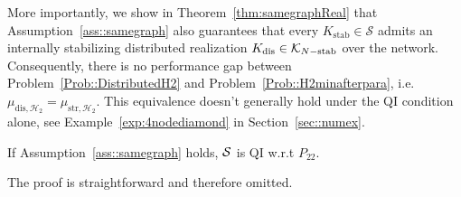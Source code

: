 More importantly, we show in Theorem~\ref{thm:samegraphReal} that Assumption~\ref{ass::samegraph} also guarantees that every \(K_\mathrm{stab}\in \mathcal{S}\) admits an internally stabilizing distributed realization \(K_{\mathrm{dis}} \in {\cal K}_{N-\text{stab}}\) over the network. Consequently, there is no performance gap between Problem~\ref{Prob::DistributedH2} and Problem~\ref{Prob::H2minafterpara}, i.e. \(\mu_{\mathrm{dis}, \mathcal{H}_2} = \mu_{\mathrm{str}, \mathcal{H}_2}\). This equivalence doesn't generally hold under the QI condition alone, see Example~\ref{exp:4nodediamond} in Section~\ref{sec::numex}.
\begin{lemma}\label{lm:samegraphQI}
If Assumption~\ref{ass::samegraph} holds, \({\cal S}\) is QI w.r.t \(P_{22}\).
\end{lemma}
The proof is straightforward and therefore omitted.
